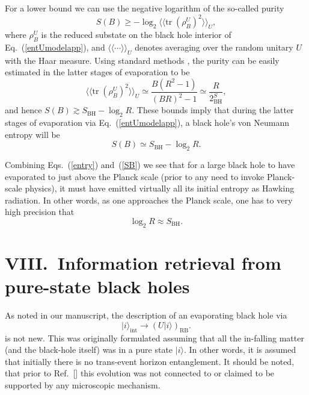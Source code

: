 \documentclass[aps,showpacs,prl,12pt]{revtex4}
\begin{document}
For a lower bound we can use the negative logarithm of the so-called purity
\begin{equation}
S(B)\geq -\log_2 \langle\!\langle 
{\text{tr}}\; (\rho_B^U)^2 \rangle\!\rangle_U,
\end{equation}
where $\rho_B^U$ is the reduced substate on the black hole interior
of Eq.~(\ref{entUmodelapp}), and
$\langle\!\langle \cdots \rangle\!\rangle_U$ denotes averaging over
the random unitary $U$ with the Haar measure. Using standard methods 
\cite{Abey06app}, the purity can be easily estimated in the latter stages
of evaporation to be
\begin{equation}
\langle\!\langle
{\text{tr}}\; (\rho_B^U)^2 \rangle\!\rangle_U
\simeq \frac{B(R^2-1)}{(BR)^2-1} \simeq \frac{R}{2^S_{\text{BH}}},
\end{equation}
and hence $S(B)\gtrsim S_{\text{BH}} -\log_2 R$. These bounds
imply that during the latter stages of evaporation via
Eq.~(\ref{entUmodelapp}), a black hole's von Neumann entropy will be
\begin{equation}
S(B)\simeq S_{\text{BH}} -\log_2 R.
\label{SB}
\end{equation}

Combining Eqs.~(\ref{entry}) and~(\ref{SB}) we see that for a large
black hole to have evaporated to just above the Planck scale 
(prior to any need to invoke Planck-scale physics), it must have emitted
virtually all its initial entropy as Hawking radiation. In other words,
as one approaches the Planck scale, one has to very high precision
that
\begin{equation}
\log_2 R \approx S_{\text{BH}}.
\end{equation}

\section{VIII.\ Information retrieval from pure-state black holes}

As noted in our manuscript, the description of an evaporating
black hole via
\begin{equation}
|i\rangle_{\text{int}}\rightarrow (U|i\rangle)_{\text{RB}}. \label{Umodelapp}
\end{equation}
is not new. This was originally formulated \cite{Page93app}
assuming that all the in-falling matter (and the black-hole itself)
was in a pure state $|i\rangle$. In other words, it is assumed that
initially there is no trans-event horizon entanglement. It should be
noted, that prior to Ref.~[] this evolution was not
connected to or claimed to be supported by any microscopic mechanism.
\end{document}
